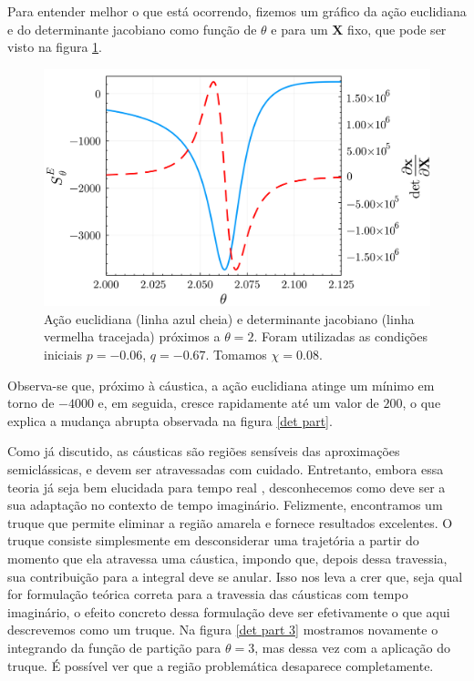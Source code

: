 \documentclass[
	12pt,
	oneside,			%
	a4paper,			%
	english,			%
	brazil				%
	]{abntex2}
\theoremstyle{definition}
\begin{document}
Para entender melhor o que está ocorrendo, fizemos um gráfico da ação euclidiana e do determinante jacobiano como função de $\theta$ e para um $\mathbf{X}$ fixo, que pode ser visto na figura \ref{Ação e determinante}.

\begin{figure}[H]
    \includegraphics[width=.8\textwidth]{Imagens/ação_e_determinante.png}
    \centering
    \caption{Ação euclidiana (linha azul cheia) e determinante jacobiano (linha vermelha tracejada) próximos a $\theta=2$. Foram utilizadas as condições iniciais $p=-0.06$, $q = -0.67$. Tomamos $\chi=0.08$.}
    \label{Ação e determinante}
\end{figure}

Observa-se que, próximo à cáustica, a ação euclidiana atinge um mínimo em torno de $-4000$ e, em seguida, cresce rapidamente até um valor de $200$, o que explica a mudança abrupta observada na figura \ref{det part}. 

Como já discutido, as cáusticas são regiões sensíveis das aproximações semiclássicas, e devem ser atravessadas com cuidado. Entretanto, embora essa teoria já seja bem elucidada para tempo real \cite{de2014metaplectic}, desconhecemos como deve ser a sua adaptação no contexto de tempo imaginário. Felizmente, encontramos um truque que permite eliminar a região amarela e fornece resultados excelentes. O truque consiste simplesmente em desconsiderar uma trajetória a partir do momento que ela atravessa uma cáustica, impondo que, depois dessa travessia, sua contribuição para a integral deve se anular. Isso nos leva a crer que, seja qual for formulação teórica correta para a travessia das cáusticas com tempo imaginário, o efeito concreto dessa formulação deve ser efetivamente o que aqui descrevemos como um truque. Na figura \ref{det part 3} mostramos novamente o integrando da função de partição para $\theta = 3$, mas dessa vez com a aplicação do truque. É possível ver que a região problemática desaparece completamente.
\end{document}
